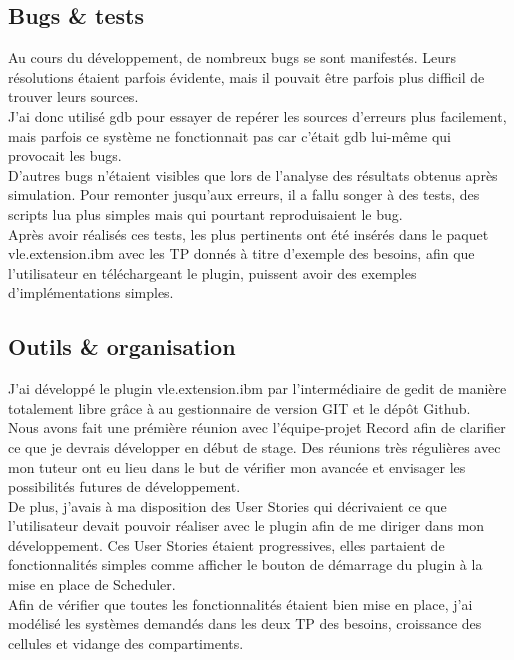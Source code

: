 \subsection{Bugs \& tests}
Au cours du développement, de nombreux bugs se sont manifestés. Leurs résolutions étaient parfois évidente, mais il pouvait être parfois plus difficil de trouver leurs sources.\\
J'ai donc utilisé gdb pour essayer de repérer les sources d'erreurs plus facilement, mais parfois ce système ne fonctionnait pas car c'était gdb lui-même qui provocait les bugs.\\
D'autres bugs n'étaient visibles que lors de l'analyse des résultats obtenus après simulation. Pour remonter jusqu'aux erreurs, il a fallu songer à des tests, des scripts lua plus simples mais qui pourtant reproduisaient le bug.\\
Après avoir réalisés ces tests, les plus pertinents ont été insérés dans le paquet vle.extension.ibm avec les TP donnés à titre d'exemple des besoins, afin que l'utilisateur en téléchargeant le plugin, puissent avoir des exemples d'implémentations simples.

\subsection{Outils \& organisation}
J'ai développé le plugin vle.extension.ibm par l'intermédiaire de gedit de manière totalement libre grâce à au gestionnaire de version GIT et le dépôt Github.\\
Nous avons fait une prémière réunion avec l'équipe-projet Record afin de clarifier ce que je devrais développer en début de stage. Des réunions très régulières avec mon tuteur ont eu lieu dans le but de vérifier mon avancée et envisager les possibilités futures de développement.\\
De plus, j'avais à ma disposition des User Stories qui décrivaient ce que l'utilisateur devait pouvoir réaliser avec le plugin afin de me diriger dans mon développement. Ces User Stories étaient progressives, elles partaient de fonctionnalités simples comme afficher le bouton de démarrage du plugin à la mise en place de Scheduler.\\
Afin de vérifier que toutes les fonctionnalités étaient bien mise en place, j'ai modélisé les systèmes demandés dans les deux TP des besoins, croissance des cellules et vidange des compartiments.